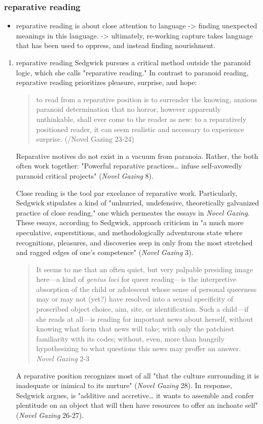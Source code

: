 \documentclass[11pt]{article}
\begin{document}
\subsubsection{reparative reading}
\label{sec:orgb4e059a}
\begin{itemize}
\item reparative reading is about close attention to language
-> finding unexpected meanings in this language.
-> ultimately, re-working capture takes language that has been used
to oppress, and instead finding nourishment.
\end{itemize}

\begin{enumerate}
\item reparative reading
\label{sec:org9b7b4d5}
Sedgwick pursues a critical method outside the paranoid logic, which
she calls "reparative reading." In contrast to paranoid reading,
reparative reading prioritizes pleasure, surprise, and hope:
\begin{quote}
to read from a reparative position is to surrender the knowing,
anxious paranoid determination that no horror, however apparently
unthinkable, shall ever come to the reader as new: to a reparatively
positioned reader, it can seem realistic and necessary to experience
surprise. (/Novel Gazing 23-24)
\end{quote}
Reparative motives do not exist in a vacuum from paranoia. Rather, the
both often work together: "Powerful reparative practices\ldots{} infuse
self-avowedly paranoid critical projects" (\emph{Novel Gazing} 8).

Close reading is the tool par excelance of reparative work.
Particularly, Sedgwick stipulates a kind of "unhurried, undefensive,
theoretically galvanized practice of close reading," one which
permeates the essays in \emph{Novel Gazing}. These essays, according to
Sedgwick, approach criticism in "a much more speculative,
superstitious, and methodologically adventurous state where
recognitions, pleasures, and discoveries seep in only from the most
stretched and ragged edges of one's competence" (\emph{Novel Gazing} 3).
\begin{quote}
It seems to me that an often quiet, but very palpable presiding image
here---a kind of \emph{genius loci} for queer reading---is the interpretive
absorption of the child or adolescent whose sense of personal
queerness may or may not (yet?) have resolved into a sexual
specificity of proscribed object choice, aim, site, or identification.
Such a child---if she reads at all---is reading for important news
about herself, without knowing what form that news will take; with
only the patchiest familiarity with its codes; without, even, more
than hungrily hypothesizing to what questions this news may proffer an
answer. \emph{Novel Gazing} 2-3
\end{quote}
A reparative position recognizes most of all "that the culture
surrounding it is inadequate or inimical to its nurture" (\emph{Novel
Gazing} 28). In response, Sedgwick argues, is "additive and
accretive\ldots{} it wants to assemble and confer plentitude on an object
that will then have resources to offer an inchoate self" (\emph{Novel
Gazing} 26-27).


\end{enumerate}
\end{document}
